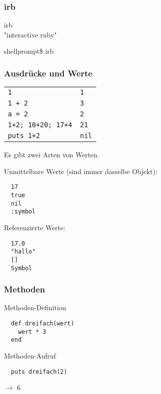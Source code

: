 \documentclass{beamer}
\begin{document}
\begin{frame}[fragile]
  \frametitle{irb}
  \begin{center}
   {\LARGE irb}\\
   
   \bigskip
   "interactive ruby"
   \bigskip
   \bigskip
   \bigskip
   \bigskip
   
  \end{center}
   shellprompt\$ irb

\end{frame}

\begin{frame}[fragile]
  \frametitle{Ausdrücke und Werte}
  \begin{tabular}[t]{l@{\hspace{5em}$\longrightarrow$}l}
    \lstinline|1|       &   \lstinline|1|  \\
    \lstinline|1 + 2|   &   \lstinline|3|  \\
    \lstinline|a = 2|   &   \lstinline|2|  \\
    \lstinline|1+2; 10+20; 17+4|  &   \lstinline|21|  \\
    \lstinline|puts 1+2|   &   \lstinline|nil|  \\
  \end{tabular}
  
  \pause
  Es gibt zwei Arten von Werten.
  
  Unmittelbare Werte (sind immer dasselbe Objekt):
  \begin{lstlisting}
  17
  true
  nil
  :symbol
  \end{lstlisting}
  \pause
  Referenzierte Werte:
  \begin{lstlisting}
  17.0
  "hallo"
  []
  Symbol
  \end{lstlisting}
\end{frame}

\begin{frame}[fragile]
  \frametitle{Methoden}
  Methoden-Definition
  \begin{lstlisting}
  def dreifach(wert)
    wert * 3
  end
  \end{lstlisting}
  \pause
  Methoden-Aufruf
  \begin{lstlisting}
  puts dreifach(2) 
  \end{lstlisting}
  $\longrightarrow$ 6
\end{frame}
\end{document}
